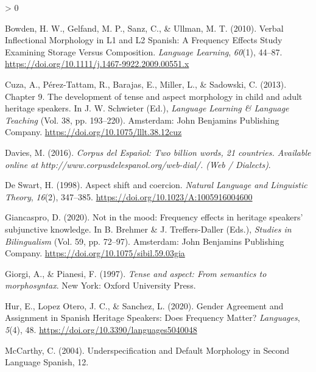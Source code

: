 \documentclass[
  english,
  man,floatsintext]{apa6}
\newlength{\cslhangindent}
\newenvironment{CSLReferences}[2] %
 {%
  \setlength{\parindent}{0pt}
  \ifodd #1 \everypar{\setlength{\hangindent}{\cslhangindent}}\ignorespaces\fi
  \ifnum #2 > 0
  \setlength{\parskip}{#2\baselineskip}
  \fi
 }%
 {}
\begin{document}
\hypertarget{refs}{}
\begin{CSLReferences}{1}{0}
\leavevmode\hypertarget{ref-bowden_verbal_2010}{}%
Bowden, H. W., Gelfand, M. P., Sanz, C., \& Ullman, M. T. (2010). Verbal {Inflectional} {Morphology} in {L1} and {L2} {Spanish}: {A} {Frequency} {Effects} {Study} {Examining} {Storage} {Versus} {Composition}. \emph{Language Learning}, \emph{60}(1), 44--87. \url{https://doi.org/10.1111/j.1467-9922.2009.00551.x}

\leavevmode\hypertarget{ref-schwieter_chapter_2013}{}%
Cuza, A., Pérez-Tattam, R., Barajas, E., Miller, L., \& Sadowski, C. (2013). Chapter 9. {The} development of tense and aspect morphology in child and adult heritage speakers. In J. W. Schwieter (Ed.), \emph{Language {Learning} \& {Language} {Teaching}} (Vol. 38, pp. 193--220). Amsterdam: John Benjamins Publishing Company. \url{https://doi.org/10.1075/lllt.38.12cuz}

\leavevmode\hypertarget{ref-davies_corpus_2016}{}%
Davies, M. (2016). \emph{Corpus del {Español}: {Two} billion words, 21 countries. {Available} online at http://www.corpusdelespanol.org/web-dial/. ({Web} / {Dialects})}.

\leavevmode\hypertarget{ref-de_swart_aspect_1998}{}%
De Swart, H. (1998). Aspect shift and coercion. \emph{Natural Language and Linguistic Theory}, \emph{16}(2), 347--385. \url{https://doi.org/10.1023/A:1005916004600}

\leavevmode\hypertarget{ref-brehmer_not_2020}{}%
Giancaspro, D. (2020). Not in the mood: {Frequency} effects in heritage speakers' subjunctive knowledge. In B. Brehmer \& J. Treffers-Daller (Eds.), \emph{Studies in {Bilingualism}} (Vol. 59, pp. 72--97). Amsterdam: John Benjamins Publishing Company. \url{https://doi.org/10.1075/sibil.59.03gia}

\leavevmode\hypertarget{ref-giorgi_tense_1997}{}%
Giorgi, A., \& Pianesi, F. (1997). \emph{Tense and aspect: From semantics to morphosyntax}. New York: Oxford University Press.

\leavevmode\hypertarget{ref-hur_gender_2020}{}%
Hur, E., Lopez Otero, J. C., \& Sanchez, L. (2020). Gender {Agreement} and {Assignment} in {Spanish} {Heritage} {Speakers}: {Does} {Frequency} {Matter}? \emph{Languages}, \emph{5}(4), 48. \url{https://doi.org/10.3390/languages5040048}

\leavevmode\hypertarget{ref-mccarthy_underspecification_2004}{}%
McCarthy, C. (2004). Underspecification and {Default} {Morphology} in {Second} {Language} {Spanish}, 12.


\end{CSLReferences}
\end{document}
